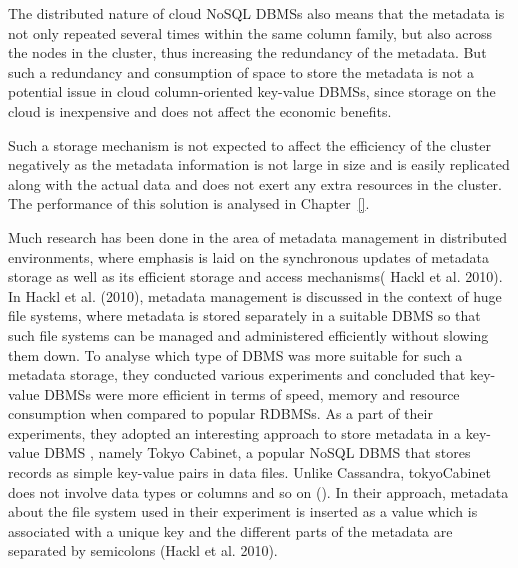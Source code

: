 	The distributed nature of cloud \ac{NoSQL} \acp{DBMS} also means that the
	metadata is not only repeated several times within the same column family,  but
	also across the nodes in the cluster, thus increasing the redundancy of
	the metadata.  But such a redundancy and consumption
	of space to store the metadata is not a potential issue
	in cloud column-oriented key-value \acp{DBMS}, since storage on the cloud is
	inexpensive and  does not affect the economic benefits.

	Such a storage mechanism is not expected to affect the efficiency of the
	cluster negatively as the metadata information is not large in size and is
	easily replicated along with the actual data and does not exert any extra
	resources in the cluster.  The performance of this solution is analysed  in
	Chapter~\ref{}.

	Much research has been done in the area of  metadata management in distributed
	environments,  where emphasis is laid on the synchronous updates of metadata
	storage as well as its efficient storage and access mechanisms(
	Hackl et al.  2010).
	In Hackl et al.  (2010),  metadata management is discussed in the context of
	huge file systems, where metadata is stored separately in a suitable \ac{DBMS}
	so that such file systems can be managed and administered efficiently without
	slowing them down.  To analyse which type of \ac{DBMS} was more suitable for such a
	metadata storage,  they conducted various experiments and concluded that
	key-value \acp{DBMS} were more efficient in terms of speed,  memory and resource
	consumption when compared to popular \acp{RDBMS}.  As a part of their
	experiments, they adopted an interesting approach to store metadata in a
	key-value \ac{DBMS} ,  namely Tokyo Cabinet,  a popular \ac{NoSQL} \ac{DBMS}
	that stores records as simple key-value pairs in data files. Unlike Cassandra,
	tokyoCabinet does not involve data types or columns
	and so on ().  In their approach,  metadata about the file system
	used in their experiment is inserted as a value which is associated with a unique key and the
	different parts of the metadata are separated by semicolons (Hackl et al.  2010).
	